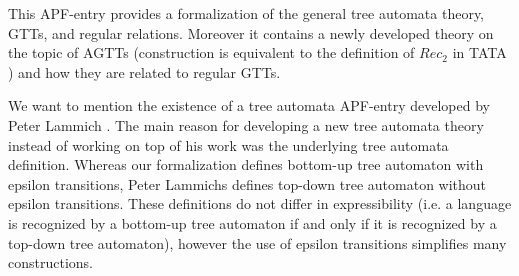 \documentclass[11pt,a4paper]{article}
\begin{document}
This APF-entry provides a formalization of the general tree automata theory, GTTs,
and regular relations. Moreover it contains a newly developed theory on the topic of
AGTTs (construction is equivalent to the definition of $Rec_2$ in TATA \cite[Chapter~3]{tata2007})
and how they are related to regular GTTs.

We want to mention the existence of a tree automata APF-entry developed by
Peter Lammich \cite{Tree-Automata-AFP}. The main reason for developing
a new tree automata theory instead of working on top of his work was
the underlying tree automata definition. Whereas our formalization defines
bottom-up tree automaton with epsilon transitions, Peter Lammichs defines
top-down tree automaton without epsilon transitions. These definitions do not differ
in expressibility (i.e. a language is recognized by a bottom-up tree automaton
if and only if it is recognized by a top-down tree automaton), however the
use of epsilon transitions simplifies many constructions.





\end{document}

